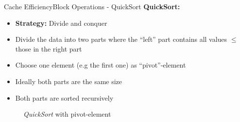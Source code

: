 \begin{frame}{Cache Efficiency}{Block Operations - QuickSort}
  \textbf{QuickSort:}\\
  \begin{itemize}
    \item<2->
      \textbf{Strategy:} Divide and conquer
      \item<3->
        Divide the data into two parts where the \enquote{left} part contains
        all values {\color{Mittel-Blau}$\leq$} those in the right part
        \item<4->
        Choose one element (e.g the first one) as
        {\color{Mittel-Blau}\enquote{pivot}-element}
      \item<5->
        Ideally both parts are the same size
      \item<6->
        Both parts are sorted recursively
  \end{itemize}
  \vspace{-1em}
  \begin{figure}%
    \begin{adjustbox}{width=\linewidth}%
    \end{adjustbox}%
    \caption{\textit{QuickSort} with pivot-element}
    \label{fig:caching:quicksort_pivot}
  \end{figure}%
\end{frame}



